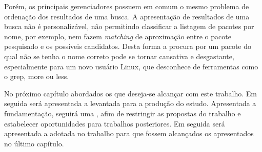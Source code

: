 Porém, os principais gerenciadores possuem em comum o mesmo problema de ordenação dos resultados de uma busca. A apresentação de resultados de uma busca não é personalizável, não permitindo classificar a listagem de pacotes por nome, por exemplo, nem fazem \textit{matching} de aproximação  entre o pacote pesquisado e os possíveis candidatos. Desta forma a procura por um pacote do qual não se tenha o nome correto pode se tornar cansativa e desgastante, especialmente para um novo usuário Linux, que desconhece de ferramentas como o {\code grep, more} ou {\code  less}. 


No próximo capítulo abordados os  que deseja-se alcançar com este trabalho. Em seguida será apresentada a  levantada para a produção do estudo. Apresentada a fundamentação, seguirá uma , afim de restringir as propostas do trabalho e estabelecer oportunidades para trabalhos posteriores. Em seguida será apresentada a  adotada no trabalho para que fossem alcançados os  apresentados no último capítulo.